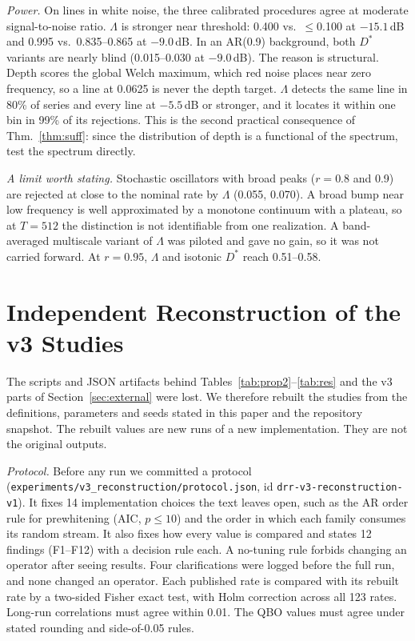 \documentclass[10pt,twocolumn,letterpaper]{article}
\theoremstyle{definition}
\theoremstyle{remark}
\newcommand{\code}[1]{\texttt{#1}}
\begin{document}
\textit{Power.} On lines in white noise, the three calibrated procedures agree
at moderate signal-to-noise ratio. $\Lambda$ is stronger near threshold: 0.400
vs.\ $\le$0.100 at $-15.1$\,dB and 0.995 vs.\ 0.835--0.865 at $-9.0$\,dB. In an
AR(0.9) background, both $D^*$ variants are nearly blind (0.015--0.030 at
$-9.0$\,dB). The reason is structural. Depth scores the global Welch maximum,
which red noise places near zero frequency, so a line at 0.0625 is never the
depth target. $\Lambda$ detects the same line in 80\% of series and every line at
$-5.5$\,dB or stronger, and it locates it within one bin in 99\% of its
rejections. This is the second practical consequence of Thm.~\ref{thm:suff}:
since the distribution of depth is a functional of the spectrum, test the
spectrum directly.

\textit{A limit worth stating.} Stochastic oscillators with broad peaks ($r=0.8$
and 0.9) are rejected at close to the nominal rate by $\Lambda$ (0.055, 0.070). A
broad bump near low frequency is well approximated by a monotone continuum with
a plateau, so at $T=512$ the distinction is not identifiable from one
realization. A band-averaged multiscale variant of $\Lambda$ was piloted and gave
no gain, so it was not carried forward. At $r=0.95$, $\Lambda$ and isotonic $D^*$
reach 0.51--0.58.

\section{Independent Reconstruction of the v3 Studies}\label{sec:recon}

The scripts and JSON artifacts behind Tables~\ref{tab:prop2}--\ref{tab:res} and
the v3 parts of Section~\ref{sec:external} were lost. We therefore rebuilt the
studies from the definitions, parameters and seeds stated in this paper and the
repository snapshot. The rebuilt values are new runs of a new implementation.
They are not the original outputs.

\textit{Protocol.} Before any run we committed a protocol
(\code{experiments/v3\_reconstruction/protocol.json}, id
\code{drr-v3-reconstruction-v1}). It fixes 14 implementation choices the text
leaves open, such as the AR order rule for prewhitening (AIC, $p\le10$) and the
order in which each family consumes its random stream. It also fixes how every
value is compared and states 12 findings (F1--F12) with a decision rule each. A
no-tuning rule forbids changing an operator after seeing results. Four
clarifications were logged before the full run, and none changed an operator.
Each published rate is compared with its rebuilt rate by a two-sided Fisher exact
test, with Holm correction across all 123 rates. Long-run correlations must agree
within 0.01. The QBO values must agree under stated rounding and side-of-0.05
rules.
\end{document}
